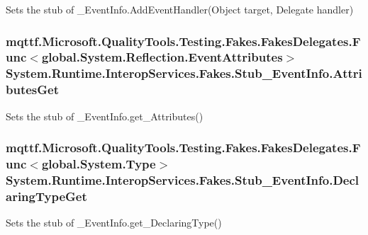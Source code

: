 Sets the stub of \-\_\-\-Event\-Info.\-Add\-Event\-Handler(\-Object target, Delegate handler)

\hypertarget{class_system_1_1_runtime_1_1_interop_services_1_1_fakes_1_1_stub___event_info_a9b7064f638a2d20ffc7d3363636d14e6}{
\subsubsection[{Attributes\-Get}]{\setlength{\rightskip}{0pt plus 5cm}mqttf.\-Microsoft.\-Quality\-Tools.\-Testing.\-Fakes.\-Fakes\-Delegates.\-Func$<$global.\-System.\-Reflection.\-Event\-Attributes$>$ System.\-Runtime.\-Interop\-Services.\-Fakes.\-Stub\-\_\-\-Event\-Info.\-Attributes\-Get}}\label{class_system_1_1_runtime_1_1_interop_services_1_1_fakes_1_1_stub___event_info_a9b7064f638a2d20ffc7d3363636d14e6}


Sets the stub of \-\_\-\-Event\-Info.\-get\-\_\-\-Attributes()

\hypertarget{class_system_1_1_runtime_1_1_interop_services_1_1_fakes_1_1_stub___event_info_a5b6cec9dbb172954db4909e08ca3188d}{
\subsubsection[{Declaring\-Type\-Get}]{\setlength{\rightskip}{0pt plus 5cm}mqttf.\-Microsoft.\-Quality\-Tools.\-Testing.\-Fakes.\-Fakes\-Delegates.\-Func$<$global.\-System.\-Type$>$ System.\-Runtime.\-Interop\-Services.\-Fakes.\-Stub\-\_\-\-Event\-Info.\-Declaring\-Type\-Get}}\label{class_system_1_1_runtime_1_1_interop_services_1_1_fakes_1_1_stub___event_info_a5b6cec9dbb172954db4909e08ca3188d}


Sets the stub of \-\_\-\-Event\-Info.\-get\-\_\-\-Declaring\-Type()

